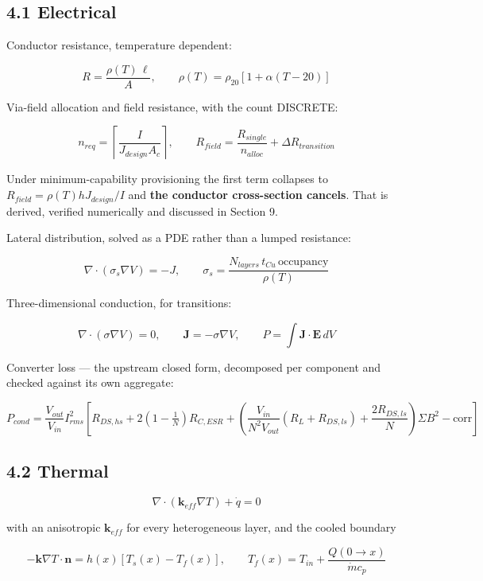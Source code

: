 \documentclass[10pt,]{article}
\begin{document}
\hypertarget{electrical}{%
\subsection{4.1 Electrical}\label{electrical}}

Conductor resistance, temperature dependent:

\[R = \frac{\rho(T)\,\ell}{A}, \qquad \rho(T) = \rho_{20}\left[1 + \alpha (T - 20)\right]\]

Via-field allocation and field resistance, with the count DISCRETE:

\[n_{req} = \left\lceil \frac{I}{J_{design} A_c} \right\rceil, \qquad R_{field} = \frac{R_{single}}{n_{alloc}} + \Delta R_{transition}\]

Under minimum-capability provisioning the first term collapses to
\(R_{field} = \rho(T) h J_{design} / I\) and \textbf{the conductor
cross-section cancels}. That is derived, verified numerically and
discussed in Section 9.

Lateral distribution, solved as a PDE rather than a lumped resistance:

\[\nabla \cdot \left( \sigma_s \nabla V \right) = -J, \qquad \sigma_s = \frac{N_{layers}\, t_{Cu}\, \text{occupancy}}{\rho(T)}\]

Three-dimensional conduction, for transitions:

\[\nabla \cdot \left( \sigma \nabla V \right) = 0, \qquad \mathbf{J} = -\sigma \nabla V, \qquad P = \int \mathbf{J} \cdot \mathbf{E}\, dV\]

Converter loss --- the upstream closed form, decomposed per component
and checked against its own aggregate:

\[P_{cond} = \frac{V_{out}}{V_{in}} I_{rms}^2 \left[ R_{DS,hs} + 2\left(1-\tfrac{1}{N}\right) R_{C,ESR} + \left( \frac{V_{in}}{N^2 V_{out}}(R_{L} + R_{DS,ls}) + \frac{2 R_{DS,ls}}{N} \right) \Sigma B^2 - \text{corr} \right]\]

\hypertarget{thermal}{%
\subsection{4.2 Thermal}\label{thermal}}

\[\nabla \cdot \left( \mathbf{k}_{eff} \nabla T \right) + \dot{q} = 0\]

with an anisotropic \(\mathbf{k}_{eff}\) for every heterogeneous layer,
and the cooled boundary

\[-\mathbf{k}\nabla T \cdot \mathbf{n} = h(x)\left[T_s(x) - T_f(x)\right], \qquad T_f(x) = T_{in} + \frac{Q(0 \to x)}{\dot{m} c_p}\]
\end{document}
